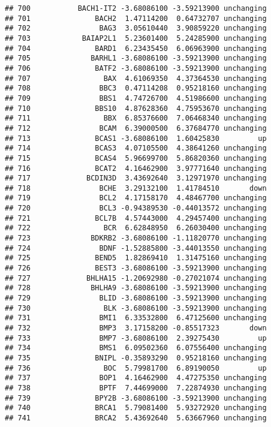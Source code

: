 \documentclass[]{article}
\begin{document}
\begin{verbatim}
## 700           BACH1-IT2 -3.68086100 -3.59213900 unchanging
## 701               BACH2  1.47114200  0.64732707 unchanging
## 702                BAG3  3.05610440  3.90859220 unchanging
## 703            BAIAP2L1  5.23601400  5.24285900 unchanging
## 704               BARD1  6.23435450  6.06963900 unchanging
## 705              BARHL1 -3.68086100 -3.59213900 unchanging
## 706               BATF2 -3.68086100 -3.59213900 unchanging
## 707                 BAX  4.61069350  4.37364530 unchanging
## 708                BBC3  0.47114208  0.95218160 unchanging
## 709                BBS1  4.74726700  4.51986600 unchanging
## 710               BBS10  4.87628360  4.75953670 unchanging
## 711                 BBX  6.85376600  7.06468340 unchanging
## 712                BCAM  6.39000500  6.37684770 unchanging
## 713               BCAS1 -3.68086100  1.60425830         up
## 714               BCAS3  4.07105500  4.38641260 unchanging
## 715               BCAS4  5.96699700  5.86820360 unchanging
## 716               BCAT2  4.16462900  3.97771640 unchanging
## 717             BCDIN3D  3.43692640  3.12971970 unchanging
## 718                BCHE  3.29132100  1.41784510       down
## 719                BCL2  4.17158170  4.48467700 unchanging
## 720                BCL3 -0.94389530 -0.44013572 unchanging
## 721               BCL7B  4.57443000  4.29457400 unchanging
## 722                 BCR  6.62848950  6.26030400 unchanging
## 723              BDKRB2 -3.68086100 -1.11820770 unchanging
## 724                BDNF -1.52885800 -3.44013550 unchanging
## 725               BEND5  1.82869410  1.31475160 unchanging
## 726               BEST3 -3.68086100 -3.59213900 unchanging
## 727             BHLHA15 -1.20692980 -0.27021074 unchanging
## 728              BHLHA9 -3.68086100 -3.59213900 unchanging
## 729                BLID -3.68086100 -3.59213900 unchanging
## 730                 BLK -3.68086100 -3.59213900 unchanging
## 731                BMI1  6.33532800  6.47125600 unchanging
## 732                BMP3  3.17158200 -0.85517323       down
## 733                BMP7 -3.68086100  2.39275430         up
## 734                BMS1  6.09502360  6.07556400 unchanging
## 735               BNIPL -0.35893290  0.95218160 unchanging
## 736                 BOC  5.79981700  6.89190050         up
## 737                BOP1  4.16462900  4.47275350 unchanging
## 738                BPTF  7.44699000  7.22874930 unchanging
## 739               BPY2B -3.68086100 -3.59213900 unchanging
## 740               BRCA1  5.79081400  5.93272920 unchanging
## 741               BRCA2  5.43692640  5.63667960 unchanging

\end{verbatim}
\end{document}
